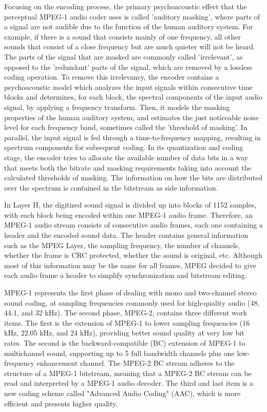 Focusing on the encoding process, the primary psychoacoustic effect that the perceptual MPEG-1 audio coder uses is called 'auditory masking', where parts of a signal are not audible due to the function of the human auditory system. For example, if there is a sound that consists mainly of one frequency, all other sounds that consist of a close frequency but are much quieter will not be heard. The parts of the signal that are masked are commonly called 'irrelevant', as opposed to the 'redundant' parts of the signal, which are removed by a lossless coding operation.
To remove this irrelevancy, the encoder contains a psychoacoustic model which analyzes the input signals within consecutive time blocks and determines, for each block, the spectral components of the input audio signal, by applying a frequency transform. Then, it models the masking properties of the human auditory system, and estimates the just noticeable noise level for each frequency band, sometimes called the 'threshold of masking'.
In parallel, the input signal is fed through a time-to-frequency mapping, resulting in spectrum components for subsequent coding. In its quantization and coding stage, the encoder tries to allocate the available number of data bits in a way that meets both the bitrate and masking requirements taking into account the calculated thresholds of masking. The information on how the bits are distributed over the spectrum is contained in the bitstream as side information.

In Layer II, the digitized sound signal is divided up into blocks of 1152 samples, with each block being encoded within one MPEG-1 audio frame.
Therefore, an MPEG-1 audio stream consists of consecutive audio frames, each one containing a header and the encoded sound data. The header contains general information such as the MPEG Layer, the sampling frequency, the number of channels, whether the frame is CRC protected, whether the sound is original, etc. Although most of this information may be the same for all frames, MPEG decided to give each audio frame a header to simplify synchronization and bitstream editing.

MPEG-1 represents the first phase of dealing with mono and two-channel stereo sound coding, at sampling frequencies commonly used for high-quality audio (48, 44.1, and 32 kHz).
The second phase, MPEG-2, contains three different work items.
The first is the extension of MPEG-1 to lower sampling frequencies (16 kHz, 22.05 kHz, and 24 kHz), providing better sound quality at very low bit rates.
The second is the backward-compatible (BC) extension of MPEG-1 to multichannel sound, supporting up to 5 full bandwidth channels plus one low-frequency enhancement channel. The MPEG-2 BC stream adheres to the structure of a MPEG-1 bitstream, meaning that a MPEG-2 BC stream can be read and interpreted by a MPEG-1 audio decoder.
The third and last item is a new coding scheme called "Advanced Audio Coding" (AAC), which is more efficient and presents higher quality.

